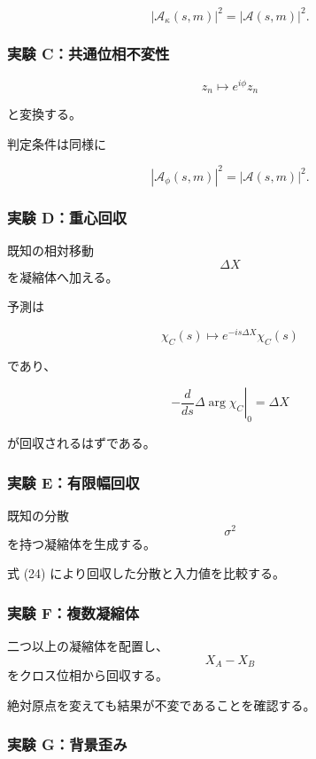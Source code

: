 \documentclass[
  a4paper,
]{ltjsarticle}
\begin{document}
\[
|\mathcal A_{\kappa}(s,m)|^2
=
|\mathcal A(s,m)|^2.
\]

\subsubsection{実験
C：共通位相不変性}\label{ux5b9fux9a13-cux5171ux901aux4f4dux76f8ux4e0dux5909ux6027}

\[
z_n\mapsto e^{i\phi}z_n
\]

と変換する。

判定条件は同様に

\[
|\mathcal A_{\phi}(s,m)|^2
=
|\mathcal A(s,m)|^2.
\]

\subsubsection{実験
D：重心回収}\label{ux5b9fux9a13-dux91cdux5fc3ux56deux53ce}

既知の相対移動 \[\Delta X\] を凝縮体へ加える。

予測は

\[
\chi_C(s)
\mapsto
 e^{-is\Delta X}
\chi_C(s)
\]

であり、

\[
{-}
\left.
\frac{d}{ds}
\Delta\arg\chi_C
\right|_0
=
\Delta X
\tag{46}
\]

が回収されるはずである。

\subsubsection{実験
E：有限幅回収}\label{ux5b9fux9a13-eux6709ux9650ux5e45ux56deux53ce}

既知の分散 \[\sigma^2\] を持つ凝縮体を生成する。

式 (24) により回収した分散と入力値を比較する。

\subsubsection{実験
F：複数凝縮体}\label{ux5b9fux9a13-fux8907ux6570ux51ddux7e2eux4f53}

二つ以上の凝縮体を配置し、\[X_A-X_B\] をクロス位相から回収する。

絶対原点を変えても結果が不変であることを確認する。

\subsubsection{実験
G：背景歪み}\label{ux5b9fux9a13-gux80ccux666fux6b6aux307f}
\end{document}
